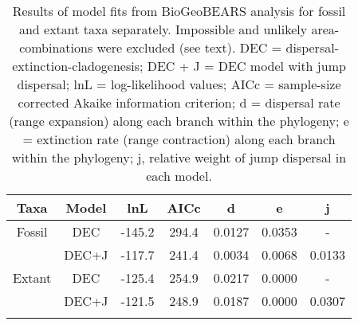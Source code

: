\begin{longtable}{ccccccc}

\caption{Results of model fits from BioGeoBEARS analysis for fossil and extant taxa separately. Impossible and unlikely area-combinations were excluded (see text). DEC = dispersal-extinction-cladogenesis; DEC + J = DEC model with jump dispersal; lnL = log-likelihood values; AICc = sample-size corrected Akaike information criterion; d = dispersal rate (range expansion) along each branch within the phylogeny; e = extinction rate (range contraction) along each branch within the phylogeny; j, relative weight of jump dispersal in each model.
}\\

\hline
\textbf{Taxa} & 
\textbf{Model} &
\textbf{lnL} &
\textbf{AICc} &
\textbf{d}&
\textbf{e} &
\textbf{j}\\
\hline
Fossil &
DEC &
-145.2 &
294.4 &
0.0127 &
0.0353 &
-\\

 &
DEC+J &
-117.7 &
241.4 &
0.0034 &
0.0068 &
0.0133 \\

Extant &
DEC &
-125.4 &
254.9 &
0.0217 &
0.0000 &
-\\

 &
DEC+J &
-121.5 &
248.9 &
0.0187 &
0.0000 &
0.0307\\
\hline

\label{table-unlikely-fossil}
\end{longtable}